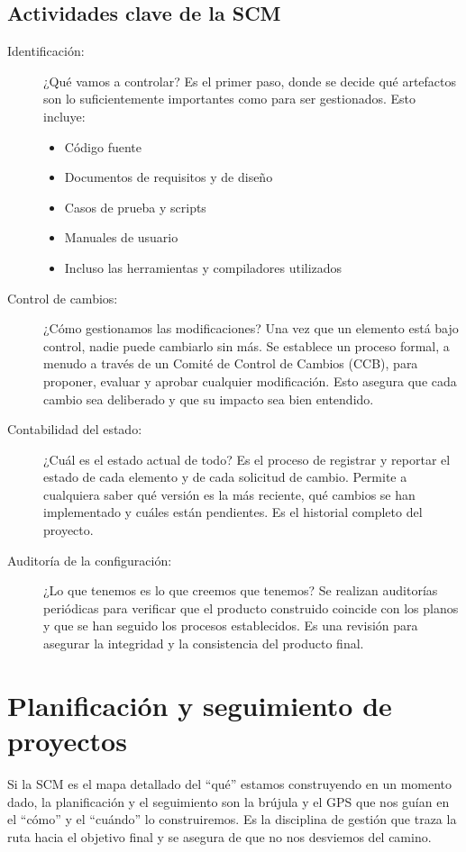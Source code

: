 \subsection*{Actividades clave de la SCM}
\begin{description}
  \item[Identificación:] ¿Qué vamos a controlar? Es el primer paso, donde se decide qué artefactos son lo suficientemente importantes como para ser gestionados. Esto incluye:
  \begin{itemize}
    \item Código fuente
    \item Documentos de requisitos y de diseño
    \item Casos de prueba y scripts
    \item Manuales de usuario
    \item Incluso las herramientas y compiladores utilizados
  \end{itemize}

  \item[Control de cambios:] ¿Cómo gestionamos las modificaciones? Una vez que un elemento está bajo control, nadie puede cambiarlo sin más. Se establece un proceso formal, a menudo a través de un Comité de Control de Cambios (CCB), para proponer, evaluar y aprobar cualquier modificación. Esto asegura que cada cambio sea deliberado y que su impacto sea bien entendido.

  \item[Contabilidad del estado:] ¿Cuál es el estado actual de todo? Es el proceso de registrar y reportar el estado de cada elemento y de cada solicitud de cambio. Permite a cualquiera saber qué versión es la más reciente, qué cambios se han implementado y cuáles están pendientes. Es el historial completo del proyecto.

  \item[Auditoría de la configuración:] ¿Lo que tenemos es lo que creemos que tenemos? Se realizan auditorías periódicas para verificar que el producto construido coincide con los planos y que se han seguido los procesos establecidos. Es una revisión para asegurar la integridad y la consistencia del producto final.
\end{description}

\section{Planificación y seguimiento de proyectos}
Si la SCM es el mapa detallado del ``qué'' estamos construyendo en un momento dado, 
la planificación y el seguimiento son la brújula y el GPS que nos guían en el ``cómo'' y el ``cuándo'' lo construiremos. 
Es la disciplina de gestión que traza la ruta hacia el objetivo final y se asegura de que no nos desviemos del camino.

